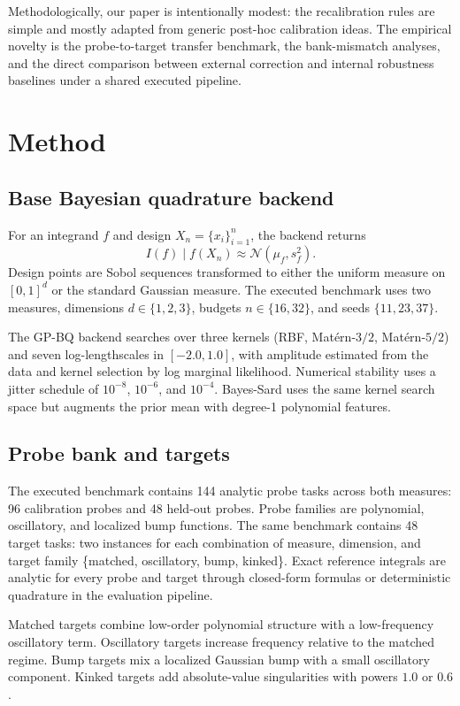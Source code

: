 \documentclass{article}
\begin{document}
Methodologically, our paper is intentionally modest: the recalibration rules are simple and mostly adapted from generic post-hoc calibration ideas. The empirical novelty is the probe-to-target transfer benchmark, the bank-mismatch analyses, and the direct comparison between external correction and internal robustness baselines under a shared executed pipeline.

\section{Method}
\label{sec:method}
\subsection{Base Bayesian quadrature backend}
For an integrand $f$ and design $X_n=\{x_i\}_{i=1}^n$, the backend returns
\[
I(f)\mid f(X_n) \approx \mathcal{N}(\mu_f,s_f^2).
\]
Design points are Sobol sequences transformed to either the uniform measure on $[0,1]^d$ or the standard Gaussian measure. The executed benchmark uses two measures, dimensions $d\in\{1,2,3\}$, budgets $n\in\{16,32\}$, and seeds $\{11,23,37\}$.

The GP-BQ backend searches over three kernels (RBF, Mat\'ern-$3/2$, Mat\'ern-$5/2$) and seven log-lengthscales in $[-2.0,1.0]$, with amplitude estimated from the data and kernel selection by log marginal likelihood. Numerical stability uses a jitter schedule of $10^{-8}$, $10^{-6}$, and $10^{-4}$. Bayes-Sard uses the same kernel search space but augments the prior mean with degree-1 polynomial features.

\subsection{Probe bank and targets}
The executed benchmark contains 144 analytic probe tasks across both measures: 96 calibration probes and 48 held-out probes. Probe families are polynomial, oscillatory, and localized bump functions. The same benchmark contains 48 target tasks: two instances for each combination of measure, dimension, and target family \{matched, oscillatory, bump, kinked\}. Exact reference integrals are analytic for every probe and target through closed-form formulas or deterministic quadrature in the evaluation pipeline.

Matched targets combine low-order polynomial structure with a low-frequency oscillatory term. Oscillatory targets increase frequency relative to the matched regime. Bump targets mix a localized Gaussian bump with a small oscillatory component. Kinked targets add absolute-value singularities with powers $1.0$ or $0.6$.
\end{document}
